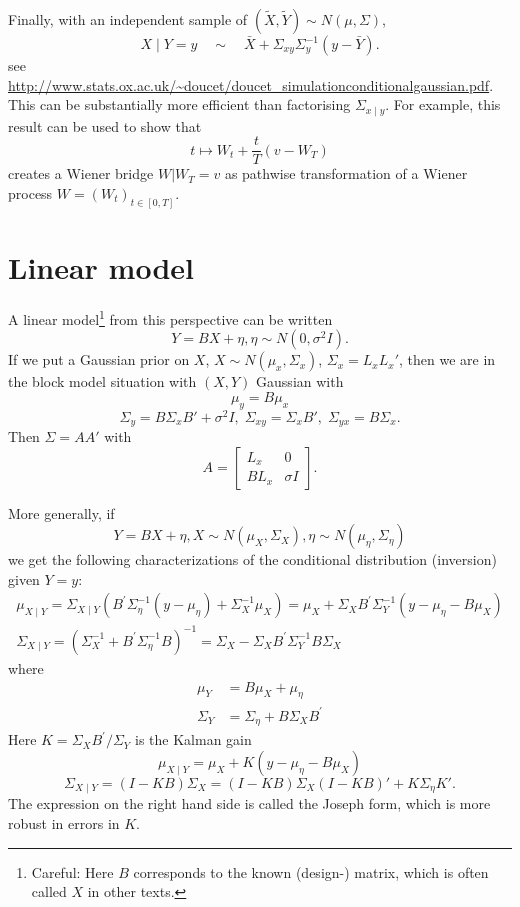 \documentclass[11pt]{article}
\begin{document}
Finally, with an independent sample of $(\tilde X,\tilde Y) \sim N(\mu, \Sigma)$,
\[
X \mid Y = y \quad \sim \quad \bar X + \Sigma_{xy} \Sigma_{y}^{-1} (y-\bar Y).
\]
see {\small \url{http://www.stats.ox.ac.uk/~doucet/doucet_simulationconditionalgaussian.pdf}}.
This can be substantially more efficient than factorising $\Sigma_{x \mid y}$.
For example, this result can be used to show that 
\[
t \mapsto W_t + \frac{t}{T}(v - W_T)
\]
creates a Wiener bridge $W | W_T = v$ as pathwise transformation of a Wiener process $W = (W_t)_{t \in [0, T]}$.


\section{Linear model}
A linear model\footnote{Careful: Here $B$ corresponds to the known (design-) matrix, which is often called $X$ in other texts. } from this perspective can be written
\[
Y = B X + \eta, \eta \sim N(0, \sigma^2I).
\]
 If we put a Gaussian prior on $X$, $X \sim N(\mu_{x}, \Sigma_{x})$, $\Sigma_{x} = L_{x} L_{x}'$, then we are in the block model situation with $(X,Y)$ Gaussian with 
\[
\mu_y = B\mu_x
\]
\[
\Sigma_{y} = B\Sigma_{x}B'+\sigma^2I,\;  \Sigma_{xy} = \Sigma_{x}B',\;  \Sigma_{yx} = B\Sigma_{x}.
\]
Then $\Sigma = AA'$ with
\[
 A = \begin{bmatrix}
L_{x} & 0\\
B L_{x} & \sigma I
\end{bmatrix}.
\]

More generally, if
\[
Y = BX + \eta, X \sim N(\mu_X, \Sigma_X), \eta \sim N(\mu_\eta, \Sigma_\eta)
\]
we get the following characterizations of the conditional distribution (inversion) given $Y=y$: 
\[
\begin{array}{l}
{\mu}_{X \mid Y}={\Sigma}_{X \mid Y}\left({B}^{\prime} {\Sigma}_{\eta}^{-1}\left(y-{\mu_\eta}\right)+{\Sigma}_{X}^{-1} {\mu}_{X}\right)={\mu}_{X}+{\Sigma}_{X} {B}^{\prime} {\Sigma}_{Y}^{-1}\left(y-{\mu_\eta}-{B} {\mu}_{X}\right) \\
{\Sigma}_{X \mid Y}=\left({\Sigma}_{X}^{-1}+{B}^{\prime} {\Sigma}_{\eta}^{-1} {B}\right)^{-1}={\Sigma}_{X}-{\Sigma}_{X} {B}^{\prime} {\Sigma}_{Y}^{-1} {B} {\Sigma}_{X}
\end{array}
\]
where
\[
\begin{aligned}
{\mu}_{Y} &={B} {\mu}_{X}+{\mu_\eta} \\
{\Sigma}_{Y} &={\Sigma}_{\eta}+{B} {\Sigma}_{X} {B}^{\prime}
\end{aligned}
\]
Here $K = {\Sigma}_{X} {B}^{\prime} /{\Sigma}_{Y}$ is the Kalman gain
\[
{\mu}_{X \mid Y} ={\mu}_{X}+K\left(y-{\mu_\eta}-{B} {\mu}_{X}\right)
\]
\[
 {\Sigma}_{X \mid Y} =\left(I-K {B} \right){\Sigma}_{X}
=  \left( {I} - {K}  {B} \right) \Sigma_X\left( {I} - {K}  {B} \right)'+ {K}  \Sigma_{\eta}  {K} '.
\]
The expression on the right hand side is called the Joseph form, which is more robust in errors in $K$.
\end{document}
